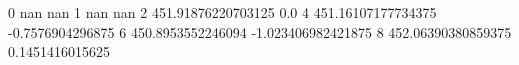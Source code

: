 0 nan nan
1 nan nan
2 451.91876220703125 0.0
4 451.16107177734375 -0.7576904296875
6 450.8953552246094 -1.023406982421875
8 452.06390380859375 0.1451416015625
